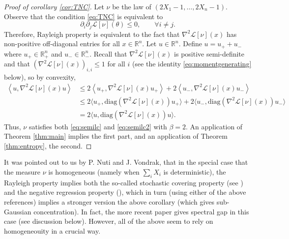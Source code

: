 \documentclass[12pt]{article}
\def \RR {\mathbb R}
\newtheorem{example}[theorem]{Example}
\theoremstyle{definition}
\theoremstyle{remark}
\begin{document}
\begin{proof}[Proof of corollary \ref{cor:TNC}]
Let $\nu$ be the law of $(2 X_1 - 1,\dots, 2 X_n - 1)$. Observe that the condition \eqref{eq:TNC} is equivalent to 
$$
\partial_i \partial_j \mathcal{L}[\nu](\theta) \leq 0,\quad\quad\forall{i\neq j}.
$$
Therefore, Rayleigh property is equivalent to the fact that $\nabla^2 \mathcal{L}[\nu](x)$ has non-positive off-diagonal entries for all $x \in \RR^n$. Let $u \in \RR^n$. Define $u = u_+ + u_-$ where $u_+ \in \RR_+^n$ and $u_- \in \RR_-^n$. Recall that $\nabla^2 \mathcal{L}[\nu](x)$ is positive semi-definite and that $\left (\nabla^2 \mathcal{L}[\nu](x) \right )_{i,i} \leq 1$ for all $i$ (see the identity \eqref{eq:momentgenerating} below), so by convexity,
\begin{align*}
\left \langle u, \nabla^2 \mathcal{L}[\nu](x) u \right \rangle & \leq 2 \left \langle u_+, \nabla^2 \mathcal{L}[\nu](x) u_+ \right \rangle + 2 \left \langle u_-, \nabla^2 \mathcal{L}[\nu](x) u_- \right \rangle \\
& \leq 2 \langle u_+, \mathrm{diag}\left ( \nabla^2 \mathcal{L}[\nu](x) \right ) u_+ \rangle + 2 \langle u_-, \mathrm{diag}\left ( \nabla^2 \mathcal{L}[\nu](x) \right ) u_- \rangle \\
& = 2 \langle u, \mathrm{diag}\left ( \nabla^2 \mathcal{L}[\nu](x) \right ) u \rangle.
\end{align*}
Thus, $\nu$ satisfies both \eqref{eq:semilc} and \eqref{eq:semilc2} with $\beta = 2$. An application of Theorem \ref{thm:main} implies the first part, and an application of Theorem \ref{thm:entropy}, the second.
\end{proof}

It was pointed out to us by P. Nuti and J. Vondrak, that in the special case that the measure $\nu$ is homogeneous (namely when $\sum_i X_i$ is deterministic), the Rayleigh property implies both the so-called stochastic covering property (see \cite{Peres-Pemantle}) and the negative regression property (\cite{Garbe-Vondrak}), which in turn (using either of the above references) implies a stronger version the above corollary (which gives sub-Gaussian concentration). In fact, the more recent paper \cite{anari2020spectral} gives spectral gap in this case (see discussion below). However, all of the above seem to rely on homogeneouity in a crucial way.

\end{document}
